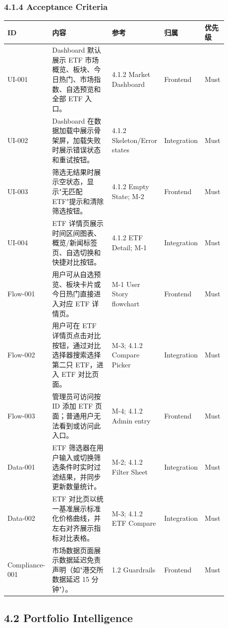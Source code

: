 
\subsubsection{4.1.4 Acceptance Criteria}

\begingroup
\small
\begin{longtable}{L{0.18\linewidth}L{0.30\linewidth}L{0.18\linewidth}L{0.12\linewidth}L{0.10\linewidth}}
\toprule
\textbf{ID} & \textbf{内容} & \textbf{参考} & \textbf{归属} & \textbf{优先级} \\
\midrule
UI-001 & Dashboard 默认展示 ETF 市场概览、板块、今日热门、市场指数、自选预览和全部 ETF 入口。 & 4.1.2 Market Dashboard & Frontend & Must \\
UI-002 & Dashboard 在数据加载中展示骨架屏，加载失败时展示错误状态和重试按钮。 & 4.1.2 Skeleton/Error states & Integration & Must \\
UI-003 & 筛选无结果时展示空状态，显示"无匹配 ETF"提示和清除筛选按钮。 & 4.1.2 Empty State; M-2 & Frontend & Must \\
UI-004 & ETF 详情页展示时间区间图表、概览/新闻标签页、自选切换和快捷对比按钮。 & 4.1.2 ETF Detail; M-1 & Integration & Must \\
Flow-001 & 用户可从自选预览、板块卡片或今日热门直接进入对应 ETF 详情页。 & M-1 User Story flowchart & Frontend & Must \\
Flow-002 & 用户可在 ETF 详情页点击对比按钮，通过对比选择器搜索选择第二只 ETF，进入 ETF 对比页面。 & M-3; 4.1.2 Compare Picker & Integration & Must \\
Flow-003 & 管理员可访问按 ID 添加 ETF 页面；普通用户无法看到或访问此入口。 & M-4; 4.1.2 Admin entry & Frontend & Must \\
Data-001 & ETF 筛选器在用户输入或切换筛选条件时实时过滤结果，并同步更新数量统计。 & M-2; 4.1.2 Filter Sheet & Integration & Must \\
Data-002 & ETF 对比页以统一基准展示标准化价格曲线，并左右对齐展示指标对比表格。 & M-3; 4.1.2 ETF Compare & Integration & Must \\
Compliance-001 & 市场数据页面展示数据延迟免责声明（如"港交所数据延迟 15 分钟"）。 & 1.2 Guardrails & Frontend & Must \\
\bottomrule
\end{longtable}
\endgroup

\subsection{4.2 Portfolio Intelligence}

